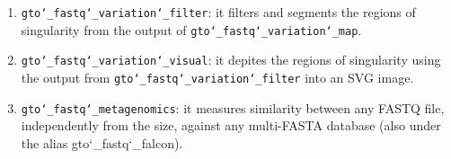 \begin{enumerate}
\item \texttt{gto\char`_fastq\char`_variation\char`_filter}: it filters and segments the regions of singularity from the output of \texttt{gto\char`_fastq\char`_variation\char`_map}.

\item \texttt{gto\char`_fastq\char`_variation\char`_visual}: it depites the regions of singularity using the output from \texttt{gto\char`_fastq\char`_variation\char`_filter} into an SVG image.

\item \texttt{gto\char`_fastq\char`_metagenomics}: it measures similarity between any FASTQ file, independently from the size, against any multi-FASTA database (also under the alias gto\char`_fastq\char`_falcon).

\end{enumerate}





























